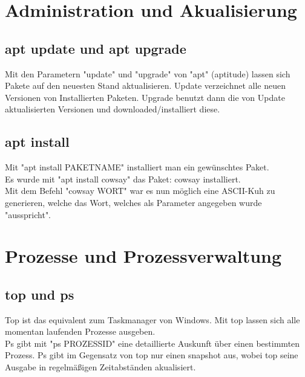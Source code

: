 \documentclass[12pt]{article}
\theoremstyle{plain}
\begin{document}
\section{Administration und Akualisierung}
\subsection{apt update und apt upgrade}
Mit den Parametern "update" und "upgrade" von "apt" (aptitude) lassen sich Pakete auf den neuesten Stand aktualisieren. Update verzeichnet alle neuen Versionen von Installierten Paketen. Upgrade benutzt dann die von Update aktualisierten Versionen und downloaded/installiert diese.
\subsection{apt install}
Mit "apt install PAKETNAME" installiert man ein gewünschtes Paket. \\
Es wurde mit "apt install cowsay" das Paket: cowsay installiert. \\
Mit dem Befehl "cowsay WORT" war es nun möglich eine ASCII-Kuh zu generieren, welche das Wort, welches als Parameter angegeben wurde "ausspricht".
\section{Prozesse und Prozessverwaltung}
\subsection{top und ps}
Top ist das equivalent zum Taskmanager von Windows. Mit top lassen sich alle momentan laufenden Prozesse ausgeben. \\
Ps gibt mit "ps PROZESSID" eine detaillierte Auskunft über einen bestimmten Prozess. Ps gibt im Gegensatz von top nur einen snapshot aus, wobei top seine Ausgabe in regelmäßigen Zeitabständen akualisiert.
\end{document}
